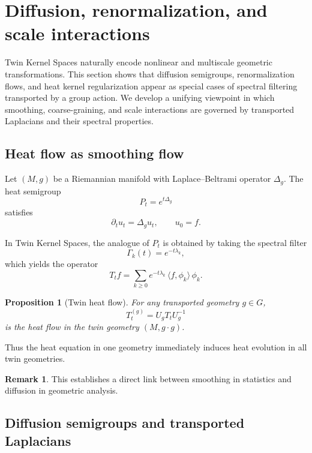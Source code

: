 \documentclass[11pt]{article}
\newtheorem{proposition}[theorem]{Proposition}
\theoremstyle{definition}
\newtheorem{remark}[theorem]{Remark}
\begin{document}
\section{Diffusion, renormalization, and scale interactions}
\label{sec:diffusion-renorm}

Twin Kernel Spaces naturally encode nonlinear and multiscale geometric transformations.
This section shows that diffusion semigroups, renormalization flows, and heat kernel regularization appear as special cases of spectral filtering transported by a group action.
We develop a unifying viewpoint in which smoothing, coarse-graining, and scale interactions are governed by transported Laplacians and their spectral properties.

\subsection{Heat flow as smoothing flow}

Let $(M,g)$ be a Riemannian manifold with Laplace–Beltrami operator $\Delta_g$.
The heat semigroup
\[
P_t = e^{t\Delta_g}
\]
satisfies
\[
\partial_t u_t = \Delta_g u_t,
\qquad
u_0=f.
\]

In Twin Kernel Spaces, the analogue of $P_t$ is obtained by taking the spectral filter
\[
\Gamma_k(t) = e^{-t\lambda_k},
\]
which yields the operator
\[
T_t f = \sum_{k\ge 0} e^{-t\lambda_k}\,\langle f,\phi_k\rangle\,\phi_k.
\]

\begin{proposition}[Twin heat flow]
	For any transported geometry $g\in G$,
	\[
	T_t^{(g)} = U_g T_t U_g^{-1}
	\]
	is the heat flow in the twin geometry $(M,g\cdot g)$.
\end{proposition}

Thus the heat equation in one geometry immediately induces heat evolution in all twin geometries.

\begin{remark}
	This establishes a direct link between smoothing in statistics and diffusion in geometric analysis.
\end{remark}

\subsection{Diffusion semigroups and transported Laplacians}
\end{document}
